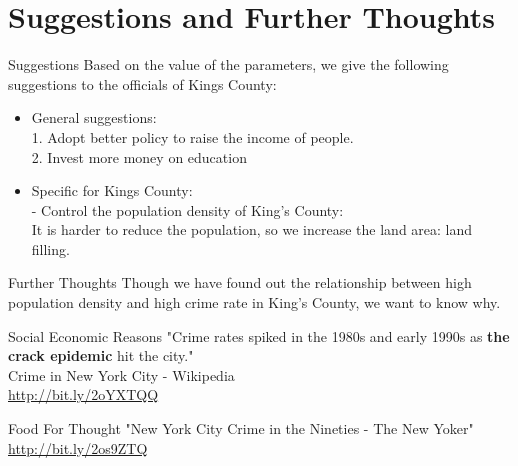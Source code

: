 \documentclass{beamer}
\begin{document}
\section{Suggestions and Further Thoughts}
\begin{frame}{Suggestions}
Based on the value of the parameters, we give the following suggestions to the officials of Kings County:
\begin{itemize}
\item General suggestions:\\
1. Adopt better policy to raise the income of people.\\
2. Invest more money on education
\item Specific for Kings County:\\
- Control the population density of King's County:\\
It is harder to reduce the population, so we increase the land area: land filling.
\end{itemize}

\end{frame}

\begin{frame}{Further Thoughts}
Though we have found out the relationship between high population density and high crime rate in King's County, we want to know why.

\begin{block}{Social Economic Reasons}
"Crime rates spiked in the 1980s and early 1990s as \textbf{the crack epidemic} hit the city."\\
\bigbreak
\small{Crime in New York City - Wikipedia\\ \url{http://bit.ly/2oYXTQQ}}
\end{block}

\begin{block}{Food For Thought}
"New York City Crime in the Nineties - The New Yoker"\\
\bigbreak
\small{\url{http://bit.ly/2os9ZTQ}}
\end{block}

\end{frame}
\end{document}
